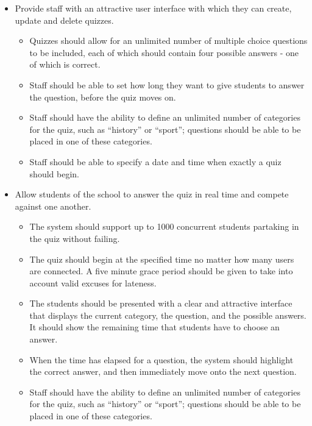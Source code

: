 \begin{itemize}
	\item Provide staff with an attractive user interface with which they can create, update and delete quizzes. 

		\begin{itemize}
			\item Quizzes should allow for an unlimited number of multiple choice questions to be included, each of which should contain four possible answers - one of which is correct.

			\item Staff should be able to set how long they want to give students to answer the question, before the quiz moves on.

			\item Staff should have the ability to define an unlimited number of categories for the quiz, such as ``history'' or ``sport''; questions should be able to be placed in one of these categories.

			\item Staff should be able to specify a date and time when exactly a quiz should begin.
		\end{itemize}

	\item Allow students of the school to answer the quiz in real time and compete against one another.

		\begin{itemize}
			\item The system should support up to 1000 concurrent students partaking in the quiz without failing.

			\item The quiz should begin at the specified time no matter how many users are connected. A five minute grace period should be given to take into account valid excuses for lateness.

			\item The students should be presented with a clear and attractive interface that displays the current category, the question, and the possible answers. It should show the remaining time that students have to choose an answer.

			\item When the time has elapsed for a question, the system should highlight the correct answer, and then immediately move onto the next question.

			\item Staff should have the ability to define an unlimited number of categories for the quiz, such as ``history'' or ``sport''; questions should be able to be placed in one of these categories.


\end{itemize}
\end{itemize}
